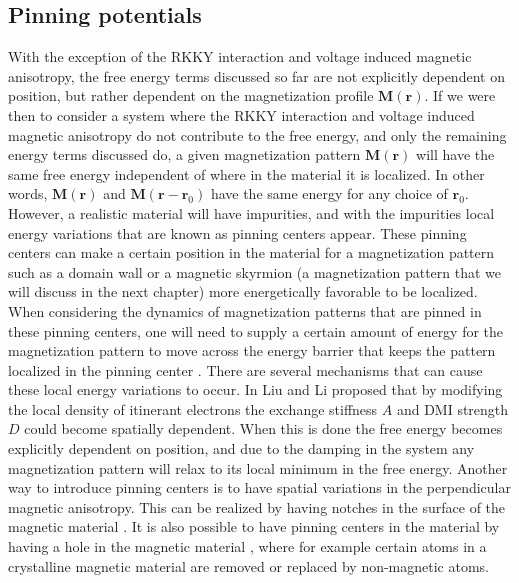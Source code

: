 \subsection{Pinning potentials}
With the exception of the RKKY interaction and voltage induced magnetic anisotropy, the free energy terms discussed so far are not explicitly dependent on position, but rather dependent on the magnetization profile $\mathbold{M}(\mathbold{r})$. If we were then to consider a system where the RKKY interaction and voltage induced magnetic anisotropy do not contribute to the free energy, and only the remaining energy terms discussed do, a given magnetization pattern $\mathbold{M}(\mathbold{r})$ will have the same free energy independent of where in the material it is localized. In other words, $\mathbold{M}(\mathbold{r})$ and $\mathbold{M}(\mathbold{r}-\mathbold{r}_0)$ have the same energy for any choice of $\mathbold{r}_0$. However, a realistic material will have impurities, and with the impurities local energy variations that are known as pinning centers appear. These pinning centers can make a certain position in the material for a magnetization pattern such as a domain wall or a magnetic skyrmion (a magnetization pattern that we will discuss in the next chapter) more energetically favorable to be localized. When considering the dynamics of magnetization patterns that are pinned in these pinning centers, one will need to supply a certain amount of energy for the magnetization pattern to move across the energy barrier that keeps the pattern localized in the pinning center \cite{Grollier2003,Parkin2008,Jonietz2010}. There are several mechanisms that can cause these local energy variations to occur. In \cite{LiuLi2013} Liu and Li proposed that by modifying the local density of itinerant electrons the exchange stiffness $A$ and DMI strength $D$ could become spatially dependent. When this is done the free energy becomes explicitly dependent on position, and due to the damping in the system any magnetization pattern will relax to its local minimum in the free energy. Another way to introduce pinning centers is to have spatial variations in the perpendicular magnetic anisotropy. This can be realized by having notches in the surface of the magnetic material \cite{Sampaio2013}. It is also possible to have pinning centers in the material by having a hole in the magnetic material \cite{Muller2015}, where for example certain atoms in a crystalline magnetic material are removed or replaced by non-magnetic atoms. 

